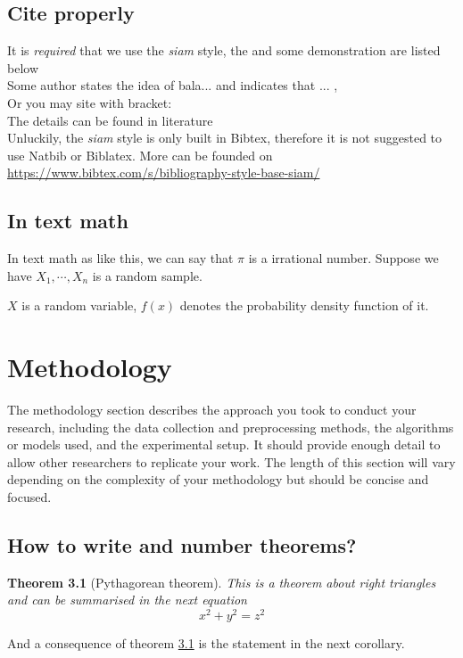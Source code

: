 \documentclass[openany]{book}
\numberwithin{figure}{chapter}
\numberwithin{equation}{chapter}
\newtheorem{theorem}{Theorem}[chapter]
\begin{document}
\section{Cite properly}

It is \emph{required} that we use the \emph{siam} style, the and some demonstration are listed below\\

Some author states the idea of bala... and  indicates that ... \cite{sperr2001survival},  \cite{sperr2001survival, bai2021statistical,cox1972regression}\\

Or you may site with bracket:\\

The details can be found in literature \cite{sperr2001survival}\\

Unluckily, the \emph{siam} style is only built in Bibtex, therefore it is not suggested to use Natbib or Biblatex. More can be founded on  \href{https://www.bibtex.com/s/bibliography-style-base-siam/}{https://www.bibtex.com/s/bibliography-style-base-siam/}

\section{In text math}
In text math as like this, we can say that $\pi$ is a irrational number. Suppose we have $X_1,\cdots, X_n$ is a random sample.

$X$ is a random variable, $f(x)$ denotes the probability density function of it.

\chapter{Methodology}

The methodology section describes the approach you took to conduct your research, including the data collection and preprocessing methods, the algorithms or models used, and the experimental setup. It should provide enough detail to allow other researchers to replicate your work. The length of this section will vary depending on the complexity of your methodology but should be concise and focused.

\section{How to write and number theorems?}
\begin{theorem}[Pythagorean theorem]
\label{thm1}
This is a theorem about right triangles and can be summarised in the next 
equation 
$$ x^2 + y^2 = z^2 $$ 
\end{theorem}
And a consequence of theorem \ref{thm1} is the statement in the next 
corollary.
\end{document}
